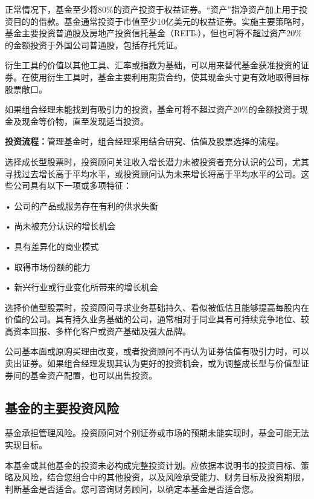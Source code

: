 \documentclass[UTF8,fontset=none,11pt,a4paper]{ctexart}
\begin{document}
正常情况下，基金至少将80\%的资产投资于权益证券。“资产”指净资产加上用于投资目的的借款。基金通常投资于市值至少10亿美元的权益证券。实施主要策略时，基金主要投资普通股及房地产投资信托基金（REITs），但也可将不超过资产20\%的金额投资于外国公司普通股，包括\allowbreak\mbox{存托凭证。}

衍生工具的价值以其他工具、汇率或指数为基础，可以用来替代基金获准投资的证券。在使用衍生工具时，基金主要利用期货合约，使其现金头寸更有效地取得目标\allowbreak\mbox{股票敞口。}

如果组合经理未能找到有吸引力的投资，基金可将不超过资产20\%的金额投资于现金及现金等价物，直至发现\allowbreak\mbox{适当投资。}

\textbf{投资流程：}管理基金时，组合经理采用结合研究、估值及股票选\allowbreak\mbox{择的流程。}

选择成长型股票时，投资顾问关注收入增长潜力未被投资者充分认识的公司，尤其寻找过去增长高于平均水平，或投资顾问认为未来增长将高于平均水平的公司。这些公司具有以下一项或\allowbreak\mbox{多项特征：}

\noindent • 公司的产品或服务存在有利的\allowbreak\mbox{供求失衡}\par\smallskip
\noindent • 尚未被充分认识的\allowbreak\mbox{增长机会}\par\smallskip
\noindent • 具有差异化的\allowbreak\mbox{商业模式}\par\smallskip
\noindent • 取得市场份\allowbreak\mbox{额的能力}\par\smallskip
\noindent • 新兴行业或行业变化所带来的\allowbreak\mbox{增长机会}\par\smallskip
选择价值型股票时，投资顾问寻求业务基础持久、看似被低估且能够提高每股内在价值的公司。具有持久业务基础的公司，通常相对于同业具有可持续竞争地位、较高资本回报、多样化客户或资产基础及\allowbreak\mbox{强大品牌。}

公司基本面或原购买理由改变，或者投资顾问不再认为证券估值有吸引力时，可以卖出证券。如果组合经理发现其认为更好的投资机会，或为调整成长型与价值型证券间的基金资产配置，也可以\allowbreak\mbox{出售投资。}

\subsection*{基金的主要投资风险}
基金承担管理风险。投资顾问对个别证券或市场的预期未能实现时，基金可能无法\allowbreak\mbox{实现目标。}

本基金或其他基金的投资未必构成完整投资计划。应依据本说明书的投资目标、策略及风险，结合您组合中的其他投资，以及风险承受能力、财务目标及投资期限，判断基金是否适合。您可咨询财务顾问，以确定本基金是\allowbreak\mbox{否适合您。}
\end{document}

